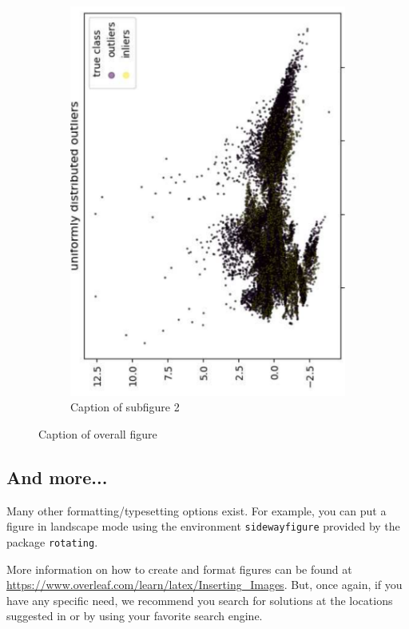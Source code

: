 \begin{figure}[!ht]
\begin{subfigure}[b]{0.45\textwidth}
         \includegraphics[angle=-90,width=\textwidth]{manual/images/graph_a.pdf}
         \caption{Caption of subfigure 2}
         \label{fig:Subfigure2}
     \end{subfigure}
     \caption{Caption of overall figure}
     \label{fig:Subfigures}
\end{figure}


\subsection{And more...}
\label{sec:FiguresMore}

Many other formatting/typesetting options exist. 
For example, you can put a figure in landscape mode using the environment \verb|sidewayfigure| provided by the package \verb|rotating|.

More information on how to create and format figures can be found at \url{https://www.overleaf.com/learn/latex/Inserting_Images}.
But, once again, if you have any specific need, we recommend you search for solutions at the locations suggested in  or by using your favorite search engine.



